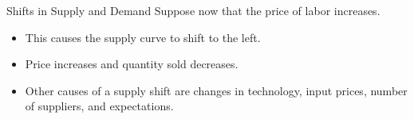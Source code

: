 \documentclass[12pt,t]{beamer}
\begin{document}
\begin{frame}{Shifts in Supply and Demand}
  Suppose now that the price of labor increases. 

  \bigskip
  \begin{itemize}
    \item This causes the supply curve to shift to the left.

    \item Price increases and quantity sold decreases.

    \item Other causes of a supply shift are changes in technology, input prices, number of suppliers, and expectations.
  \end{itemize}
\end{frame}
\end{document}
